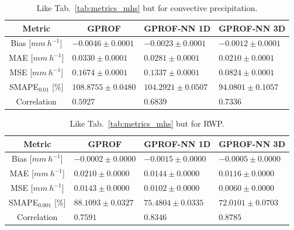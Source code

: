 \documentclass[journal abbreviation, manuscript]{copernicus}
\begin{document}
\begin{table}[hbpt!]
  \centering
  \caption{Like Tab.~\ref{tab:metrics_mhs} but for convective precipitation.}
  \label{tab:metrics_mhs_convective}
\begin{tabular}{|c||p{3.5cm}|p{3.5cm}|p{3.5cm}|}
  \hline
  Metric &
  \multicolumn{1}{|c}{GPROF} &
  \multicolumn{1}{|c}{GPROF-NN 1D} &
  \multicolumn{1}{|c|}{GPROF-NN 3D} \\
  \hline\hline
  Bias \hfill [$\unit{mm\ h^{-1}}$] & \hfill $ -0.0046 \pm 0.0001$ &\hfill $ -0.0023 \pm 0.0001$ &\hfill $ -0.0012 \pm 0.0001$ \\
  MAE \hfill [$\unit{mm\ h^{-1}}$] & \hfill $  0.0330 \pm 0.0001$ &\hfill $  0.0281 \pm 0.0001$ &\hfill $  0.0210 \pm 0.0001$ \\
  MSE \hfill [$\unit{mm\ h^{-1}}$] & \hfill $  0.1674 \pm 0.0001$ &\hfill $  0.1337 \pm 0.0001$ &\hfill $  0.0824 \pm 0.0001$ \\
  SMAPE$_{0.01}$ \hfill [$\unit{\%}$] & \hfill $108.8755 \pm 0.0480$ &\hfill $104.2921 \pm 0.0507$ &\hfill $ 94.0801 \pm 0.1057$ \\
  Correlation & \hfill $  0.5927 $ &\hfill $  0.6839$ &\hfill $  0.7336$ \\
  \hline
\end{tabular}

\end{table}

\clearpage

\begin{table}[hbpt!]
  \centering
  \caption{Like Tab.~\ref{tab:metrics_mhs} but for RWP.}
  \label{tab:metrics_mhs_rwp}
  \begin{tabular}{|c||p{3.5cm}|p{3.5cm}|p{3.5cm}|}
    \hline
    Metric &
    \multicolumn{1}{|c}{GPROF} &
    \multicolumn{1}{|c}{GPROF-NN 1D} &
    \multicolumn{1}{|c|}{GPROF-NN 3D} \\
    \hline\hline
    Bias \hfill [$\unit{mm\ h^{-1}}$] & \hfill $ -0.0002 \pm 0.0000$ &\hfill $ -0.0015 \pm 0.0000$ &\hfill $ -0.0005 \pm 0.0000$ \\
    MAE \hfill [$\unit{mm\ h^{-1}}$] & \hfill $  0.0210 \pm 0.0000$ &\hfill $  0.0144 \pm 0.0000$ &\hfill $  0.0116 \pm 0.0000$ \\
    MSE \hfill [$\unit{mm\ h^{-1}}$] & \hfill $  0.0143 \pm 0.0000$ &\hfill $  0.0102 \pm 0.0000$ &\hfill $  0.0060 \pm 0.0000$ \\
    SMAPE$_{0.001}$ \hfill [$\unit{\%}$] & \hfill $ 88.1093 \pm 0.0327$ &\hfill $ 75.4804 \pm 0.0335$ &\hfill $ 72.0101 \pm 0.0703$ \\
    Correlation & \hfill $  0.7591 $ &\hfill $  0.8346 $ &\hfill $  0.8785 $ \\
    \hline
  \end{tabular}

\end{table}
\clearpage
\end{document}
